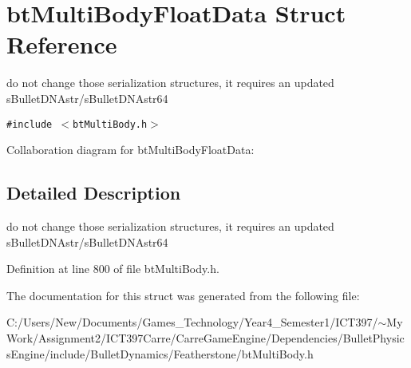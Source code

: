 \hypertarget{structbt_multi_body_float_data}{
\section{btMultiBodyFloatData Struct Reference}
\label{structbt_multi_body_float_data}
}
do not change those serialization structures, it requires an updated sBulletDNAstr/sBulletDNAstr64  


{\tt \#include $<$btMultiBody.h$>$}

Collaboration diagram for btMultiBodyFloatData:

\subsection{Detailed Description}
do not change those serialization structures, it requires an updated sBulletDNAstr/sBulletDNAstr64 

Definition at line 800 of file btMultiBody.h.

The documentation for this struct was generated from the following file:\begin{CompactItemize}
\item 
C:/Users/New/Documents/Games\_\-Technology/Year4\_\-Semester1/ICT397/$\sim$My Work/Assignment2/ICT397Carre/CarreGameEngine/Dependencies/BulletPhysicsEngine/include/BulletDynamics/Featherstone/btMultiBody.h\end{CompactItemize}
